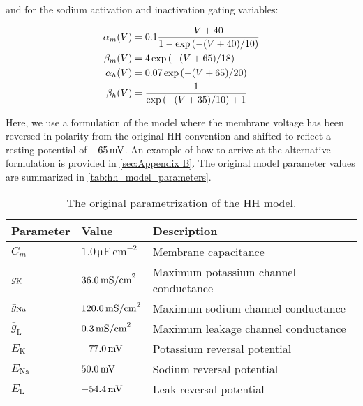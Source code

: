 and for the sodium activation and inactivation gating variables: 

\begin{subequations}
    \begin{align}
        \alpha_m (V) &= 0.1 \frac{V + 40}{1 - \exp \qty(-(V+40)/10)}
        \\
        \beta_m (V) &= 4 \exp \qty(-(V+65)/18)
        \\
        \alpha_h (V) &= 0.07 \exp \qty(-(V+65)/20)
        \\
        \beta_h (V) &= \frac{1}{\exp \qty(-(V+35)/10) + 1}
    \end{align}
\end{subequations}


Here, we use a formulation of the model where the membrane voltage has been reversed in polarity from the original HH convention and shifted to reflect a resting potential of $-65 \,\mathrm{mV}$. An example of how to arrive at the alternative formulation is provided in \autoref{sec:Appendix B}. The original model parameter values are summarized in \autoref{tab:hh_model_parameters}.

\begin{table}[!htb]
  \caption{The original parametrization of the HH model.}
  \begin{center}
    \begin{tabular}{lll}
      \toprule
      \textbf{Parameter} & \textbf{Value} & \textbf{Description} \\
      \midrule
      $C_m$ & $1.0 \, \mathrm{\mu F \, cm}^{-2}$ & Membrane capacitance
      \\
      $\bar{g}_{\mathrm{K}}$ & $36.0 \,\mathrm{mS/cm}^2$ & Maximum potassium channel conductance 
      \\
      $\bar{g}_{\mathrm{Na}}$ & $120.0 \,\mathrm{mS/cm}^2$ & Maximum sodium channel conductance 
      \\
      $\bar{g}_\mathrm{L}$ & $0.3 \,\mathrm{mS/cm}^2$ & Maximum leakage channel conductance
      \\
      $E_\mathrm{K}$ & $-77.0 \,\mathrm{mV}$ & Potassium reversal potential
      \\
      $E_\mathrm{Na}$ & $50.0 \,\mathrm{mV}$ & Sodium reversal potential
      \\
      $E_\mathrm{L}$ & $-54.4 \,\mathrm{mV}$ & Leak reversal potential
      \\
      \bottomrule
    \end{tabular}
  \end{center}
  \label{tab:hh_model_parameters}
\end{table}

